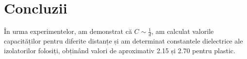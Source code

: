 \documentclass[12pt]{article}
\begin{document}
\section{Concluzii}

În urma experimentelor, am demonstrat că \( C \sim \frac{1}{d} \), am calculat valorile capacităților pentru diferite distanțe și am determinat constantele dielectrice ale izolatorilor folosiți, obținând valori de aproximativ 2.15 și 2.70 pentru plastic.
\end{document}
